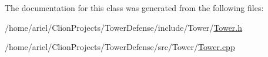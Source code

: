 The documentation for this class was generated from the following files\+:\begin{DoxyCompactItemize}
\item 
/home/ariel/\+Clion\+Projects/\+Tower\+Defense/include/\+Tower/\hyperlink{Tower_8h}{Tower.\+h}\item 
/home/ariel/\+Clion\+Projects/\+Tower\+Defense/src/\+Tower/\hyperlink{Tower_8cpp}{Tower.\+cpp}\end{DoxyCompactItemize}
